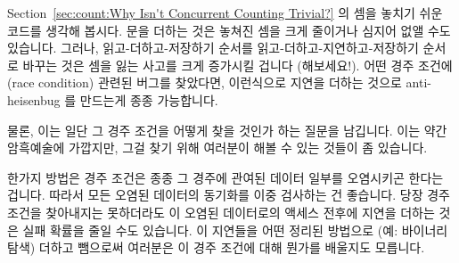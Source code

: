 Section~\ref{sec:count:Why Isn't Concurrent Counting Trivial?} 의 셈을 놓치기
쉬운 코드를 생각해 봅시다.
 문을 더하는 것은 놓쳐진 셈을 크게 줄이거나 심지어 없앨 수도
있습니다.
그러나, 읽고-더하고-저장하기 순서를 읽고-더하고-지연하고-저장하기 순서로 바꾸는
것은 셈을 잃는 사고를 크게 증가시킬 겁니다 (해보세요!).
어떤 경주 조건에 (race condition) 관련된 버그를 찾았다면, 이런식으로 지연을
더하는 것으로 anti-heisenbug 를 만드는게 종종 가능합니다.

물론, 이는 일단 그 경주 조건을 어떻게 찾을 것인가 하는 질문을 남깁니다.
이는 약간 암흑예술에 가깝지만, 그걸 찾기 위해 여러분이 해볼 수 있는 것들이 좀
있습니다.

한가지 방법은 경주 조건은 종종 그 경주에 관여된 데이터 일부를 오염시키곤 한다는
겁니다.
따라서 모든 오염된 데이터의 동기화를 이중 검사하는 건 좋습니다.
당장 경주 조건을 찾아내지는 못하더라도 이 오염된 데이터로의 액세스 전후에
지연을 더하는 것은 실패 확률을 줄일 수도 있습니다.
이 지연들을 어떤 정리된 방법으로 (예: 바이너리 탐색) 더하고 뺌으로써 여러분은
이 경주 조건에 대해 뭔가를 배울지도 모릅니다.

